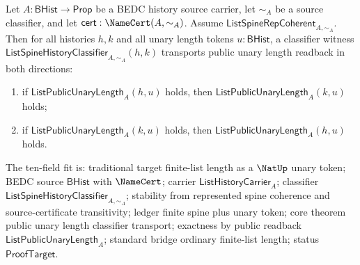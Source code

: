 \begin{theorem}
\label{thm:list-public-unary-length-classifier-transport}
Let $A:\mathsf{BHist}\to\mathsf{Prop}$ be a BEDC history source carrier, let
$\sim_A$ be a source classifier, and let
$\mathsf{cert}:\NameCert(A,\sim_A)$. Assume
$\mathsf{ListSpineRepCoherent}_{A,\sim_A}$. Then for all histories $h,k$ and
all unary length tokens $u:\mathsf{BHist}$, a classifier witness
$\mathsf{ListSpineHistoryClassifier}_{A,\sim_A}(h,k)$ transports public unary
length readback in both directions:
\begin{enumerate}
  \item if $\mathsf{ListPublicUnaryLength}_A(h,u)$ holds, then
  $\mathsf{ListPublicUnaryLength}_A(k,u)$ holds;
  \item if $\mathsf{ListPublicUnaryLength}_A(k,u)$ holds, then
  $\mathsf{ListPublicUnaryLength}_A(h,u)$ holds.
\end{enumerate}
The ten-field fit is: traditional target finite-list length as a $\NatUp$ unary
token; BEDC source $\mathsf{BHist}$ with $\NameCert$; carrier
$\mathsf{ListHistoryCarrier}_A$; classifier
$\mathsf{ListSpineHistoryClassifier}_{A,\sim_A}$; stability from represented
spine coherence and source-certificate transitivity; ledger finite spine plus
unary token; core theorem public unary length classifier transport; exactness by
public readback $\mathsf{ListPublicUnaryLength}_A$; standard bridge ordinary
finite-list length; status $\mathsf{ProofTarget}$.
\end{theorem}
